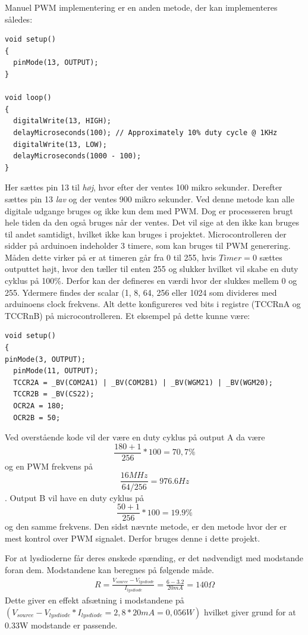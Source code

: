 Manuel PWM implementering er en anden metode, der kan implementeres således:

\begin{lstlisting}
void setup()
{
  pinMode(13, OUTPUT);
}

void loop()
{
  digitalWrite(13, HIGH);
  delayMicroseconds(100); // Approximately 10% duty cycle @ 1KHz
  digitalWrite(13, LOW);
  delayMicroseconds(1000 - 100);
}
\end{lstlisting}

Her sættes pin 13 til \textit{høj}, hvor efter der ventes 100 mikro sekunder. Derefter sættes pin 13 \textit{lav} og der ventes 900 mikro sekunder. Ved denne metode kan alle digitale udgange bruges og ikke kun dem med PWM. Dog er processeren brugt hele tiden da den også bruges når der ventes. Det vil sige at den ikke kan bruges til andet samtidigt, hvilket ikke kan bruges i projektet.
Microcontrolleren der sidder på arduinoen indeholder 3 timere, som kan bruges til PWM generering.  Måden dette virker på er at timeren går fra 0 til 255, hvis $Timer=0$ sættes outputtet højt, hvor den tæller til enten 255 og slukker hvilket vil skabe en duty cyklus på 100\%. Derfor kan der defineres en værdi hvor der slukkes mellem 0 og 255. Ydermere findes der scalar (1, 8, 64, 256 eller 1024 som divideres med arduinoens clock frekvens. Alt dette konfigureres ved bits i registre (TCCRnA og TCCRnB) på microcontrolleren. Et eksempel på dette kunne være: 

\begin{lstlisting}
void setup()
{
pinMode(3, OUTPUT);
  pinMode(11, OUTPUT);
  TCCR2A = _BV(COM2A1) | _BV(COM2B1) | _BV(WGM21) | _BV(WGM20);
  TCCR2B = _BV(CS22);
  OCR2A = 180;
  OCR2B = 50;
\end{lstlisting}

Ved overstående kode vil der være en duty cyklus på output A da være $$\frac{180+1}{256}*100=70,7\%$$ og en PWM frekvens på     
  $$\frac{16MHz}{64/256}=976.6Hz$$. Output B vil have en duty cyklus på $$\frac{50+1}{256}*100=19.9 \%$$ og den samme frekvens. Den sidst nævnte metode, er den metode hvor der er mest kontrol over PWM signalet. Derfor bruges denne i dette projekt.
  
For at lysdioderne får deres ønskede spænding, er det nødvendigt med modstande foran dem. Modstandene kan beregnes på følgende måde. 
\begin{align}
R=\frac{V_{source}-V_{lysdiode}}{I_{lysdiode}}=\frac{6-3.2}{20mA}=140\Omega
\label{eq:modstandLEDmotor}
\end{align} 
Dette giver en effekt afsætning i modstandene på $(V_{source}-V_{lysdiode}*I_{lysdiode}=2,8*20mA=0,056W)$ hvilket giver grund for at 0.33W modstande er passende.

